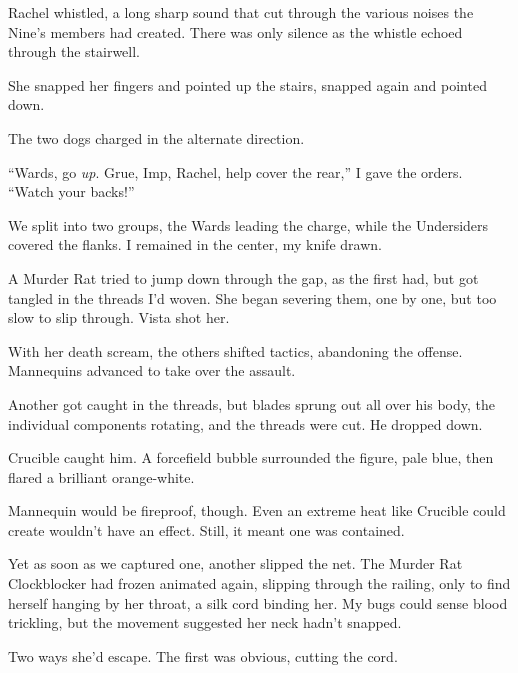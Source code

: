 Rachel whistled, a long sharp sound that cut through the various noises the Nine's members had created.  There was only silence as the whistle echoed through the stairwell.



She snapped her fingers and pointed up the stairs, snapped again and pointed down.



The two dogs charged in the alternate direction.



``Wards, go \emph{up}.  Grue, Imp, Rachel, help cover the rear,'' I gave the orders.  ``Watch your backs!''



We split into two groups, the Wards leading the charge, while the Undersiders covered the flanks.  I remained in the center, my knife drawn.



A Murder Rat tried to jump down through the gap, as the first had, but got tangled in the threads I'd woven.  She began severing them, one by one, but too slow to slip through.  Vista shot her.



With her death scream, the others shifted tactics, abandoning the offense.  Mannequins advanced to take over the assault.



Another got caught in the threads, but blades sprung out all over his body, the individual components rotating, and the threads were cut.  He dropped down.



Crucible caught him.  A forcefield bubble surrounded the figure, pale blue, then flared a brilliant orange-white.



Mannequin would be fireproof, though.  Even an extreme heat like Crucible could create wouldn't have an effect.  Still, it meant one was contained.



Yet as soon as we captured one, another slipped the net.  The Murder Rat Clockblocker had frozen animated again, slipping through the railing, only to find herself hanging by her throat, a silk cord binding her.  My bugs could sense blood trickling, but the movement suggested her neck hadn't snapped.



Two ways she'd escape.  The first was obvious, cutting the cord.



